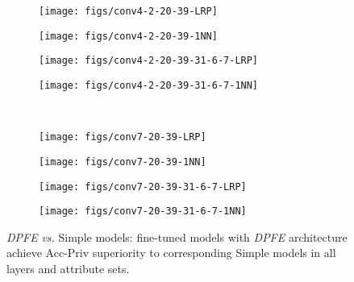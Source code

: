 \documentclass[10pt,journal,compsoc]{IEEEtran}
\begin{document}
\begin{figure*}[!ht] 
	\centering
	\begin{subfigure}[t]{0.25\textwidth}
		\centering
		\texttt{[image: figs/conv4-2-20-39-LRP]}
	\end{subfigure}%
	\begin{subfigure}[t]{0.25\textwidth}
		\centering
		\texttt{[image: figs/conv4-2-20-39-1NN]}
	\end{subfigure}%
	\begin{subfigure}[t]{0.25\textwidth}
		\centering
		\texttt{[image: figs/conv4-2-20-39-31-6-7-LRP]}
	\end{subfigure}%
	\begin{subfigure}[t]{0.25\textwidth}
		\centering
		\texttt{[image: figs/conv4-2-20-39-31-6-7-1NN]}
	\end{subfigure}
	\\
	\vspace{15pt}
	\begin{subfigure}[t]{0.25\textwidth}
		\centering
		\texttt{[image: figs/conv7-20-39-LRP]}
	\end{subfigure}%
	\begin{subfigure}[t]{0.25\textwidth}
		\centering
		\texttt{[image: figs/conv7-20-39-1NN]}
	\end{subfigure}%
	\begin{subfigure}[t]{0.25\textwidth}
		\centering
		\texttt{[image: figs/conv7-20-39-31-6-7-LRP]}
	\end{subfigure}%
	\begin{subfigure}[t]{0.25\textwidth}
		\centering
		\texttt{[image: figs/conv7-20-39-31-6-7-1NN]}
	\end{subfigure}
	\caption{\emph{DPFE} \emph{vs.} Simple models: fine-tuned models with \emph{DPFE} architecture achieve Acc-Priv superiority to corresponding Simple models in all layers and attribute sets.}
	\label{fig:dpfe_vs_simple}
\end{figure*}%
\end{document}
